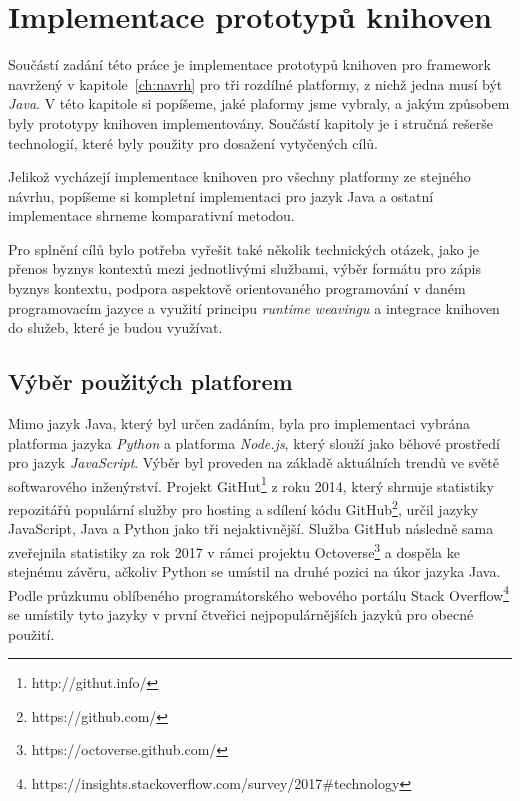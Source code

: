 \usepackage[T1]{fontenc}
\usepackage[utf8]{inputenc}


\chapter{Implementace prototypů knihoven}\label{ch:implementace}

Součástí zadání této práce je implementace prototypů
knihoven pro framework navržený v kapitole~\ref{ch:navrh}
pro tři rozdílné platformy, z nichž jedna musí být \textit{Java}.
V této kapitole si popíšeme, jaké plaformy jsme vybraly, a jakým
způsobem byly prototypy knihoven implementovány. Součástí
kapitoly je i stručná rešerše technologií, které byly použity
pro dosažení vytyčených cílů.

Jelikož vycházejí implementace knihoven pro všechny platformy
ze stejného návrhu, popíšeme si kompletní implementaci pro jazyk
Java a ostatní implementace shrneme komparativní metodou.

Pro splnění cílů bylo potřeba vyřešit také několik technických otázek,
jako je přenos byznys kontextů mezi jednotlivými službami, výběr formátu
pro zápis byznys kontextu, podpora aspektově orientovaného programování
v daném programovacím jazyce a využití principu \textit{runtime weavingu}
a integrace knihoven do služeb, které je budou využívat.

\section{Výběr použitých platforem}

Mimo jazyk Java, který byl určen zadáním, byla pro
implementaci vybrána platforma jazyka \textit{Python}
a platforma \textit{Node.js}, který slouží jako
běhové prostředí pro jazyk \textit{JavaScript}.
Výběr byl proveden na základě aktuálních trendů
ve světě softwarového inženýrství. Projekt GitHut\footnote{http://githut.info/}
z roku 2014, který shrnuje statistiky repozitářů
populární služby pro hosting a sdílení kódu
GitHub\footnote{https://github.com/}, určil
jazyky JavaScript, Java a Python jako tři nejaktivnější.
Služba GitHub následně sama zveřejnila statistiky za rok 2017
v rámci projektu Octoverse\footnote{https://octoverse.github.com/}
a dospěla ke stejnému závěru, ačkoliv Python se umístil na druhé
pozici na úkor jazyka Java. Podle průzkumu oblíbeného
programátorského webového portálu Stack
Overflow\footnote{https://insights.stackoverflow.com/survey/2017\#technology}
se umístily tyto jazyky v první čtveřici nejpopulárnějších jazyků pro obecné použití.

